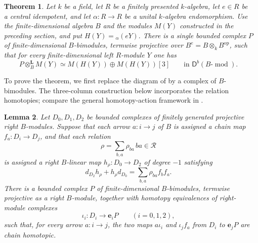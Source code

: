 \documentclass[11pt]{article}
\newtheorem{theorem}{Theorem}[section]
\numberwithin{equation}{section}
\newtheorem{lemma}[theorem]{Lemma}
\theoremstyle{definition}
\theoremstyle{remark}
\newcommand{\D}{\mathsf D}
\newcommand{\otL}{\otimes^{\mathbf L}}
\DeclareMathOperator{\modu}{mod}
\begin{document}
\begin{theorem}\label{thm:realization}
Let \(k\) be a field, let \(R\) be a finitely presented \(k\)-algebra,
let \(e\in R\) be a central idempotent, and let
\(\alpha:R\to R\) be a unital $k$-algebra endomorphism.
Use the finite-dimensional algebra \(B\) and the modules \(M(Y)\)
constructed in the preceding section, and put
\(H(Y)={}_{\alpha}(eY)\).
There is a single bounded complex \(P\) of finite-dimensional
\(B\)-bimodules, termwise projective over $B^e=B\otimes_k B^{\mathrm{op}}$, such that for
every finite-dimensional left \(R\)-module \(Y\) one has
\begin{equation}\label{eq:realization}
 P\otL_B M(Y)
 \simeq M(H(Y))\oplus M(H(Y))[3]
 \qquad\text{in }\D^b(B\text{-}\modu).
\end{equation}
\end{theorem}

To prove the theorem, we first replace the diagram of
 by a complex of \(B\)-bimodules.
The three-column construction below incorporates the relation homotopies;
compare the general homotopy-action framework in \cite{Keller2000}.

\begin{lemma}\label{lem:rectification}
Let \(D_0,D_1,D_2\) be bounded complexes of finitely generated projective
right \(B\)-modules.  Suppose that each arrow \(a:i\to j\) of \(B\)
is assigned a chain map \(f_a:D_i\to D_j\), and that each relation
\[
 \rho=\sum_{b,a}\rho_{ba}\,ba\in\mathcal R
\]
is assigned a right \(B\)-linear map \(h_\rho:D_0\to D_2\) of degree
\(-1\) satisfying
\[
 d_{D_2}h_\rho+h_\rho d_{D_0}
 = \sum_{b,a}\rho_{ba}f_bf_a .
\]
There is a bounded complex \(P\) of finite-dimensional \(B\)-bimodules,
termwise projective as a right \(B\)-module, together with homotopy
equivalences of right-module complexes
\[
 \iota_i:D_i\longrightarrow \mathbf e_iP \qquad (i=0,1,2),
\]
such that, for every arrow \(a:i\to j\), the two maps
\(a\iota_i\) and \(\iota_jf_a\) from \(D_i\) to \(\mathbf e_jP\)
are chain homotopic.
\end{lemma}
\end{document}
